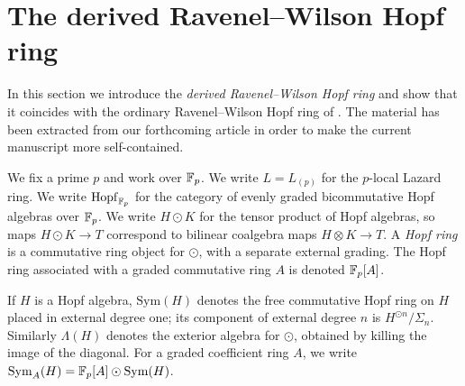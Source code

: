 \section{The derived Ravenel--Wilson Hopf ring}\label{app:rw-derived}
\providecommand{\gpt}[1]{\todo[color=cyan!25,linecolor=cyan!60!black,bordercolor=cyan!60!black]{\textcolor{teal!80!black}{#1}}}
\providecommand{\Free}{\operatorname{Free}}
\providecommand{\Ga}{{\mathbb G}_a}
\providecommand{\RW}{\mathrm{RW}}
\providecommand{\dRW}{\scr{RW}}
\providecommand{\Sym}{\mathrm{Sym}}
\providecommand{\LSym}{\operatorname{LSym}}
\providecommand{\Vect}{\mathrm{Vect}}
\providecommand{\hotimes}{\odot}
\providecommand{\htimes}{\otimes}
\providecommand{\hH}{\mathfrak H}
\providecommand{\frob}{\mathrm f}
\providecommand{\ver}{\mathrm v}
\providecommand{\wittprojection}{\mathrm \pi}
\providecommand{\HCAlg}{\mathrm{HCAlg}}
\providecommand{\Hopf}{\mathrm{Hopf}}
\providecommand{\MU}{\mathrm{MU}}
\providecommand{\Set}{\mathrm{Set}}
\providecommand{\Ab}{\mathrm{Ab}}
\providecommand{\cn}{\mathrm{cn}}
\providecommand{\cl}{\pi}
\providecommand{\A}{\mathbb A}
\providecommand{\cof}{\operatorname{cof}}
\providecommand{\comp}{\wedge}
\providecommand{\wequi}{\simeq}
\providecommand{\ph}{\mathord-}
\providecommand{\fr}{\mathrm{fr}}
\providecommand{\Hom}{\operatorname{Hom}}
\providecommand{\CAlg}{\mathrm{CAlg}}
\providecommand{\cCAlg}{\mathrm{cCAlg}}
\providecommand{\bCAlg}{\mathrm{bCAlg}}
\providecommand{\1}{\mathbbm{1}}

In this section we introduce the \emph{derived Ravenel--Wilson Hopf ring} and show that it coincides with the ordinary Ravenel--Wilson Hopf ring of \cite{ravenel-wilson}.
The material has been extracted from our forthcoming article \cite{bachmann-wilson} in order to make the current manuscript more self-contained.

We fix a prime $p$ and work over $\mathbb{F}_p$.
We write $L=L_{(p)}$ for the $p$-local Lazard ring.  We write $\Hopf_{\F_p}$ for the category of evenly graded bicommutative Hopf algebras over $\mathbb{F}_p$. We write $H\hotimes K$ for the tensor product of Hopf algebras, so maps $H\hotimes K\to T$ correspond to bilinear coalgebra maps $H\htimes K\to T$. A \emph{Hopf ring} is a commutative ring object for $\hotimes$, with a separate external grading.
The Hopf ring associated with a graded commutative ring $A$ is denoted $\mathbb{F}_p[A]$.

If $H$ is a Hopf algebra, $\Sym(H)$ denotes the free commutative Hopf ring on $H$ placed in external degree one; its component of external degree $n$ is $H^{\hotimes n}/\Sigma_n$. Similarly $\Lambda(H)$ denotes the exterior algebra for $\hotimes$, obtained by killing the image of the diagonal. For a graded coefficient ring $A$, we write $\Sym_A(H)=\F_p[A]\hotimes\Sym(H)$.

